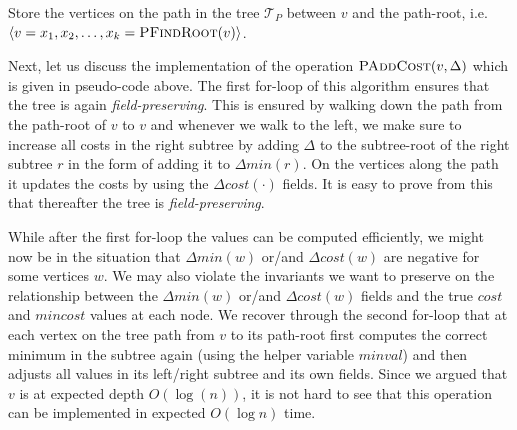 \begin{algorithm}
  \SetAlgoLined
  \DontPrintSemicolon
  Store the vertices on the path in the tree $\mathcal{T}_{P}$ between $v$ and the path-root, i.e. $\langle v = x_1, x_2, \ldots, x_k = \textsc{PFindRoot}(v)\rangle$.\\
  
  \caption{$\textsc{PAddCost}(v, \Delta)$}
\end{algorithm}

Next, let us discuss the implementation of the operation $\textsc{PAddCost}(v, \Delta)$ which is given in pseudo-code above. The first for-loop of this algorithm ensures that the tree is again \emph{field-preserving}. This is ensured by walking down the path from the path-root of $v$ to $v$ and whenever we walk to the left, we make sure to increase all costs in the right subtree by adding $\Delta$ to the subtree-root of the right subtree $r$ in the form of adding it to $\Delta min(r)$. On the vertices along the path it updates the costs by using the $\Delta cost(\cdot)$ fields. It is easy to prove from this that thereafter the tree is  \emph{field-preserving}.

While after the first for-loop the values can be computed efficiently, we might now be in the situation that $\Delta min(w)$ or/and $\Delta cost(w)$ are negative for some vertices $w$. We may also  violate the invariants we want to preserve on the relationship between the $\Delta min(w)$ or/and $\Delta cost(w)$ fields and the true $cost$ and $mincost$ values at each node. We recover through the second for-loop that at each vertex on the tree path from $v$ to its path-root first computes the correct minimum in the subtree again (using the helper variable $\textit{minval}$) and then adjusts all values in its left/right subtree and its own fields. Since we argued that $v$ is at expected depth $O(\log(n))$, it is not hard to see that this operation can be implemented in expected $O(\log n)$ time.


